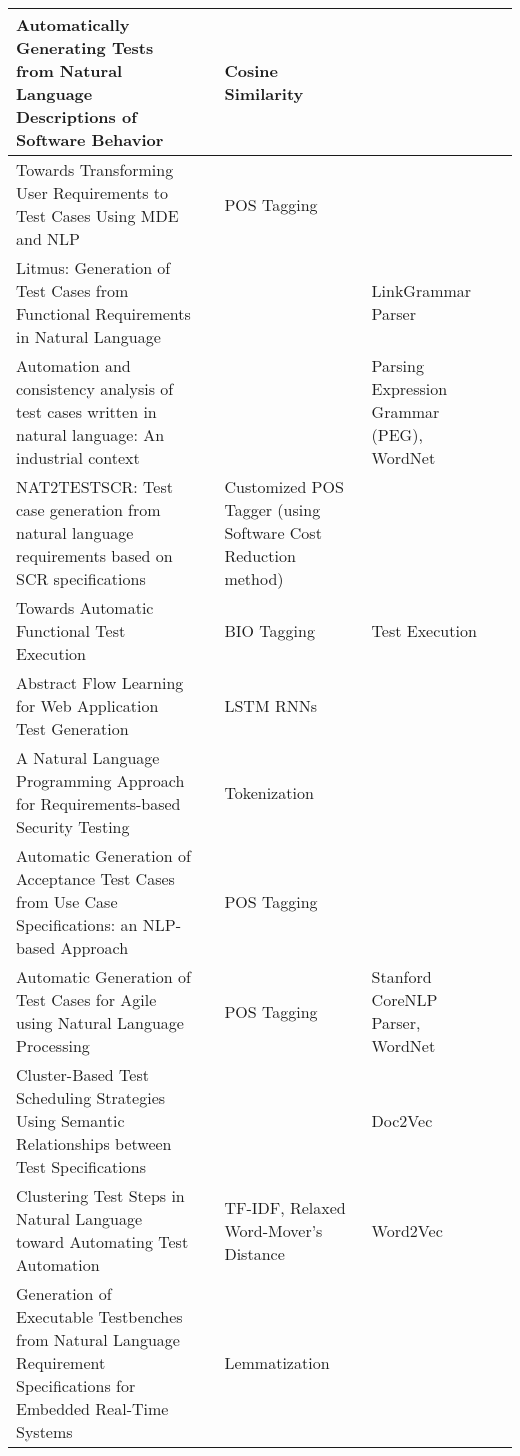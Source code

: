 \begin{appendices}
\begin{table}[H]
{\begin{tabular}{ |p{3cm}|p{3cm}|p{3cm}|p{3cm}|p{3cm}| }
            \hline Automatically Generating Tests from Natural Language Descriptions of Software Behavior  & \cite{kamalakar2013automatically} & Cosine Similarity & \\
            \hline Towards Transforming User Requirements to Test Cases Using MDE and NLP & \cite{allala2019towards} &  POS Tagging & \\
            \hline Litmus: Generation of Test Cases from Functional Requirements in Natural Language  & \cite{litmus} &  & LinkGrammar Parser\\
            \hline Automation and consistency analysis of test cases written in natural language: An industrial context & \cite{arruda2020automation} &   & Parsing Expression Grammar (PEG), WordNet\\
            \hline NAT2TESTSCR: Test case generation from natural language requirements based on SCR specifications  & \cite{carvalho2014nat2testscr} &  Customized POS Tagger (using Software Cost Reduction method) & \\
            \hline Towards Automatic Functional Test Execution & \cite{pedemonte2012towards} & BIO Tagging & Test Execution\\
            \hline Abstract Flow Learning for Web Application Test Generation  & \cite{10.1145/3278186.3278194} & LSTM RNNs & \\
            \hline A Natural Language Programming Approach for Requirements-based Security Testing & \cite{mai2018natural} & Tokenization & \\
            \hline Automatic Generation of Acceptance Test Cases from Use Case Specifications: an NLP-based Approach & \cite{wang2020automatic} &  POS Tagging & \\
            \hline Automatic Generation of Test Cases for Agile using Natural Language Processing & \cite{rane2017automatic} & POS Tagging & Stanford CoreNLP Parser, WordNet\\
            \hline Cluster-Based Test Scheduling Strategies Using Semantic Relationships between Test Specifications & \cite{10.1145/3195538.3195540} &   & Doc2Vec\\
            \hline Clustering Test Steps in Natural Language toward Automating Test Automation & \cite{10.1145/3368089.3417067} & TF-IDF, Relaxed Word-Mover's Distance & Word2Vec\\
            \hline Generation of Executable Testbenches from Natural Language Requirement Specifications for Embedded Real-Time Systems & \cite{mueller2010generation} & Lemmatization & \\

\end{tabular}}
\end{table}
\end{appendices}
